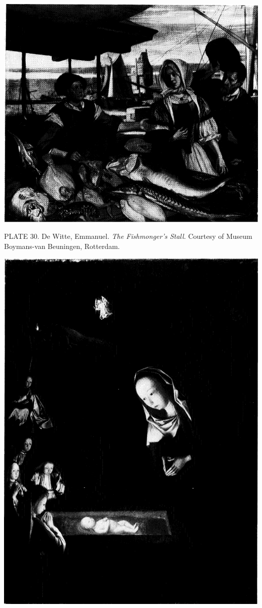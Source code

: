 \protect\hypertarget{20_ILLUSTRATIONS_FOLLOW_PAGE.xhtmlux5cux23id_27}{}{}\includegraphics{include/html/images/347_1.png}

PLATE 30. De Witte, Emmanuel. \emph{The Fishmonger's Stall}. Courtesy of
Museum Boymans-van Beuningen, Rotterdam.

\protect\hypertarget{20_ILLUSTRATIONS_FOLLOW_PAGE.xhtmlux5cux23id_28}{}{}\includegraphics{include/html/images/348_1.png}

